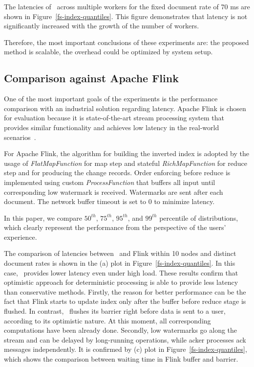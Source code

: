The latencies of \FlameStream\ across multiple workers for the fixed document rate of 70 ms are shown in Figure~\ref{fs-index-quantiles}. This figure demonstrates that latency is not significantly increased with the growth of the number of workers. 

Therefore, the most important conclusions of these experiments are: the proposed method is scalable, the overhead could be optimized by system setup.

\subsection{Comparison against Apache Flink}

One of the most important goals of the experiments is the performance comparison with an industrial solution regarding latency. Apache Flink is chosen for evaluation because it is state-of-the-art stream processing system that provides similar functionality and achieves low latency in the real-world scenarios~\cite{S7530084}. 

For Apache Flink, the algorithm for building the inverted index is adopted by the usage of {\it FlatMapFunction} for map step and stateful {\it RichMapFunction} for reduce step and for producing the change records. Order enforcing before reduce is implemented using custom {\it ProcessFunction} that buffers all input until corresponding low watermark is received. Watermarks are sent after each document. The network buffer timeout is set to 0 to minimize latency.

In this paper, we compare $50^{th}$, $75^{th}$, $95^{th}$, and $99^{th}$ percentile of distributions, which clearly represent the performance from the perspective of the users' experience.

The comparison of latencies between \FlameStream\ and Flink within 10 nodes and distinct document rates is shown in the (a) plot in Figure~\ref{fs-index-quantiles}. In this case, \FlameStream\ provides lower latency even under high load. These results confirm that optimistic approach for deterministic processing is able to provide less latency than conservative methods. Firstly, the reason for better performance can be the fact that Flink starts to update index only after the buffer before reduce stage is flushed. In contrast, \FlameStream\ flushes its barrier right before data is sent to a user, according to its optimistic nature. At this moment, all corresponding computations have been already done. Secondly, low watermarks go along the stream and can be delayed by long-running operations, while acker processes ack messages independently. It is confirmed by (c) plot in Figure~\ref{fs-index-quantiles}, which shows the comparison between waiting time in Flink buffer and \FlameStream barrier.

